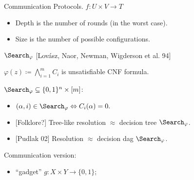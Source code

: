 

\begin{frame}{Communication Protocols. $f\colon U \times V \to T$}
    \begin{center}
    	    
    \end{center}

    \pause
    \pause
    \pause
	\pause

    \begin{itemize}
        \item Depth is the number of rounds (in the worst case).
        \item Size is the number of possible configurations.
    \end{itemize}
\end{frame}

\begin{frame}{$\Search_{\varphi}$ [Lov{\'{a}}sz, Naor, Newman, Wigderson et al. 94]}

    \begin{minipage}{0.48\linewidth}
        $\varphi(z) \coloneqq \bigwedge\limits_{i = 1}^{m} C_i$ is unsatisfiable CNF formula.
        \pause

        $\Search_{\varphi} \subseteq \{0, 1\}^n \times [m]$:
        \begin{itemize}
            \item $(\alpha, i) \in \Search_{\varphi} \Leftrightarrow C_{i}(\alpha) = 0.$
        \end{itemize}
    \end{minipage}
    \begin{minipage}{0.48\linewidth}
        \begin{itemize}
            \item {[Folklore?]} Tree-like resolution $\approx$ decision tree $\Search_{\varphi}$.
            \item {[Pudlak 02]} Resolution $\approx$ decision \alert{dag} $\Search_{\varphi}$.
        \end{itemize}
    \end{minipage}

    \pause
    \vspace{0.4cm}
    Communication version:
    \begin{itemize}
        \item ``gadget'' $g\colon X \times Y \to \{0, 1\}$;
    \end{itemize}

    \pause
    \begin{center}
        
    \end{center}
\end{frame}


